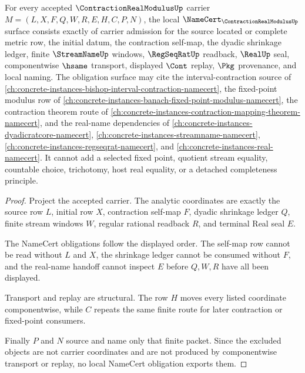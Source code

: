 \begin{theorem}\label{thm:contraction-real-modulus-namecert-obligations}
For every accepted $\ContractionRealModulusUp$ carrier $M=(L,X,F,Q,W,R,E,H,C,P,N)$, the local $\NameCert_{\ContractionRealModulusUp}$ surface consists exactly of carrier admission for the source located or complete metric row, the initial datum, the contraction self-map, the dyadic shrinkage ledger, finite $\StreamNameUp$ windows, $\RegSeqRatUp$ readback, $\RealUp$ seal, componentwise $\hsame$ transport, displayed $\Cont$ replay, $\Pkg$ provenance, and local naming. The obligation surface may cite the interval-contraction source of \autoref{ch:concrete-instances-bishop-interval-contraction-namecert}, the fixed-point modulus row of \autoref{ch:concrete-instances-banach-fixed-point-modulus-namecert}, the contraction theorem route of \autoref{ch:concrete-instances-contraction-mapping-theorem-namecert}, and the real-name dependencies of \autoref{ch:concrete-instances-dyadicratcore-namecert}, \autoref{ch:concrete-instances-streamname-namecert}, \autoref{ch:concrete-instances-regseqrat-namecert}, and \autoref{ch:concrete-instances-real-namecert}. It cannot add a selected fixed point, quotient stream equality, countable choice, trichotomy, host real equality, or a detached completeness principle.
\end{theorem}
\begin{proof}
Project the accepted carrier. The analytic coordinates are exactly the source row $L$, initial row $X$, contraction self-map $F$, dyadic shrinkage ledger $Q$, finite stream windows $W$, regular rational readback $R$, and terminal Real seal $E$.

The NameCert obligations follow the displayed order. The self-map row cannot be read without $L$ and $X$, the shrinkage ledger cannot be consumed without $F$, and the real-name handoff cannot inspect $E$ before $Q,W,R$ have all been displayed.

Transport and replay are structural. The row $H$ moves every listed coordinate componentwise, while $C$ repeats the same finite route for later contraction or fixed-point consumers.

Finally $P$ and $N$ source and name only that finite packet. Since the excluded objects are not carrier coordinates and are not produced by componentwise transport or replay, no local NameCert obligation exports them.
\end{proof}

